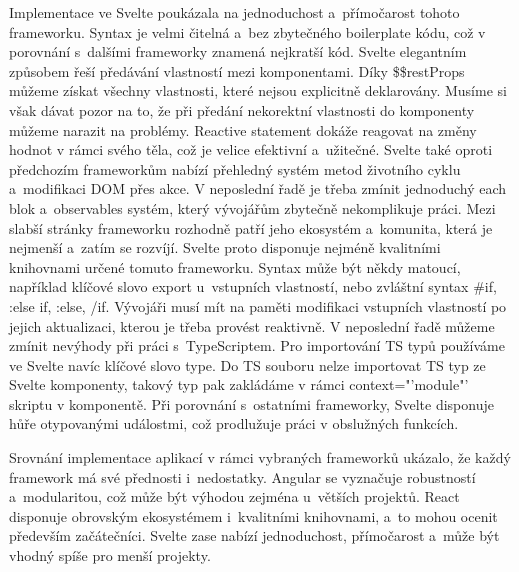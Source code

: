 Implementace ve Svelte poukázala na jednoduchost a~přímočarost tohoto frameworku. 
Syntax je velmi čitelná a~bez zbytečného boilerplate kódu, což v porovnání s~dalšími frameworky znamená nejkratší kód. 
Svelte elegantním způsobem řeší předávání vlastností mezi komponentami. 
Díky \$\$restProps můžeme získat všechny vlastnosti, které nejsou explicitně deklarovány. 
Musíme si však dávat pozor na to, že při předání nekorektní vlastnosti do komponenty můžeme narazit na problémy. 
Reactive statement dokáže reagovat na změny hodnot v rámci svého těla, což je velice efektivní a~užitečné. 
Svelte také oproti předchozím frameworkům nabízí přehledný systém metod životního cyklu a~modifikaci DOM přes akce. 
V neposlední řadě je třeba zmínit jednoduchý each blok a~observables systém, který vývojářům zbytečně nekomplikuje práci.
Mezi slabší stránky frameworku rozhodně patří jeho ekosystém a~komunita, která je nejmenší a~zatím se rozvíjí. 
Svelte proto disponuje nejméně kvalitními knihovnami určené tomuto frameworku. 
Syntax může být někdy matoucí, například klíčové slovo export u~vstupních vlastností, nebo zvláštní syntax \#if, :else if, :else, /if. 
Vývojáři musí mít na paměti modifikaci vstupních vlastností po jejich aktualizaci, kterou je třeba provést reaktivně. 
V neposlední řadě můžeme zmínit nevýhody při práci s~TypeScriptem. Pro importování TS typů používáme ve Svelte navíc klíčové slovo type. 
Do TS souboru nelze importovat TS typ ze Svelte komponenty, takový typ pak zakládáme v rámci context="'module"' skriptu v komponentě.
Při porovnání s~ostatními frameworky, Svelte disponuje hůře otypovanými událostmi, což prodlužuje práci v obslužných funkcích.


Srovnání implementace aplikací v rámci vybraných frameworků ukázalo, že každý framework má své přednosti i~nedostatky. 
Angular se vyznačuje robustností a~modularitou, což může být výhodou zejména u~větších projektů. 
React disponuje obrovským ekosystémem i~kvalitními knihovnami, a~to mohou ocenit především začátečníci. 
Svelte zase nabízí jednoduchost, přímočarost a~může být vhodný spíše pro menší projekty.